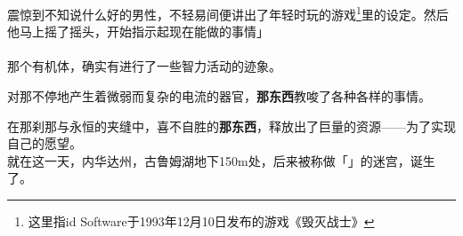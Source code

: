 震惊到不知说什么好的男性，不轻易间便讲出了年轻时玩的游戏\footnote{这里指id Software于1993年12月10日发布的游戏《毁灭战士》}里的设定。然后他马上摇了摇头，开始指示起现在能做的事情」\\

\sqsplit\\

那个有机体，确实有进行了一些智力活动的迹象。

对那不停地产生着微弱而复杂的电流的器官，\textbf{那东西}教唆了各种各样的事情。

在那刹那与永恒的夹缝中，喜不自胜的\textbf{那东西}，释放出了巨量的资源——为了实现自己的愿望。\\

就在这一天，内华达州，古鲁姆湖地下150m处，后来被称做「」的迷宫，诞生了。\\
